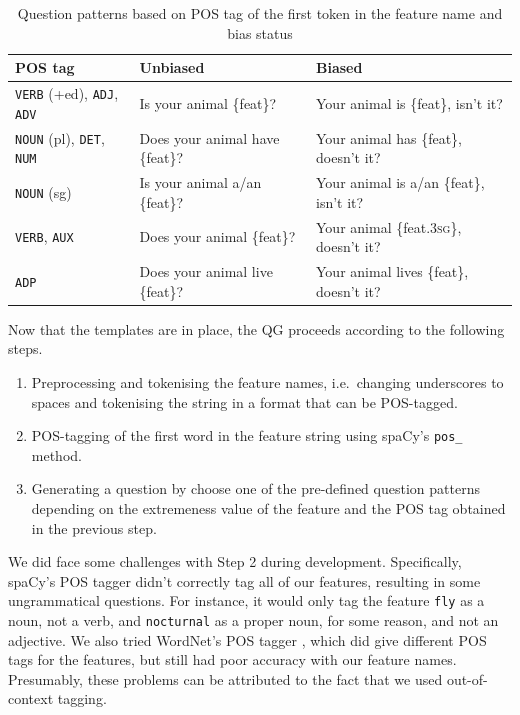 \documentclass[11pt,a4paper]{article}
\begin{document}
\begin{table}[ht]
\centering
	\begin{tabularx}{\linewidth}{lLL}
		\toprule
		POS tag & Unbiased & Biased \\
		\midrule
		\texttt{VERB} (+ed), \texttt{ADJ}, \texttt{ADV} & Is your animal \{feat\}? & Your animal is \{feat\}, isn't it? \\
		\texttt{NOUN} (pl), \texttt{DET}, \texttt{NUM} & Does your animal have \{feat\}? & Your animal has \{feat\}, doesn't it? \\
		\texttt{NOUN} (sg) & Is your animal a/an \{feat\}? & Your animal is a/an \{feat\}, isn't it? \\
		\texttt{VERB}, \texttt{AUX} & Does your animal \{feat\}? & Your animal \{feat.\textsc{3sg}\}, doesn't it? \\
		\texttt{ADP} & Does your animal live \{feat\}? & Your animal lives \{feat\}, doesn't it? \\ 
		\bottomrule
	\end{tabularx}
\caption{Question patterns based on POS tag of the first token in the feature name and bias status}
\label{tab:question_patterns}
\end{table}

Now that the templates are in place, the QG proceeds according to the following steps.

\begin{enumerate}
  \item Preprocessing and tokenising the feature names, i.e.\ changing underscores to spaces and tokenising the string in a format that can be POS-tagged.
  \item POS-tagging of the first word in the feature string using spaCy's \texttt{pos\_} method.
  \item Generating a question by choose one of the pre-defined question patterns depending on the extremeness value of the feature and the POS tag obtained in the previous step.
\end{enumerate}

We did face some challenges with Step 2 during development.
Specifically, spaCy's POS tagger didn't correctly tag all of our features, resulting in some ungrammatical questions.
For instance, it would only tag the feature \texttt{fly} as a noun, not a verb, and \texttt{nocturnal} as a proper noun, for some reason, and not an adjective.
We also tried WordNet's POS tagger \citep{Fellbaum2010}, which did give different POS tags for the features, but still had poor accuracy with our feature names. 
Presumably, these problems can be attributed to the fact that we used out-of-context tagging.
\end{document}
